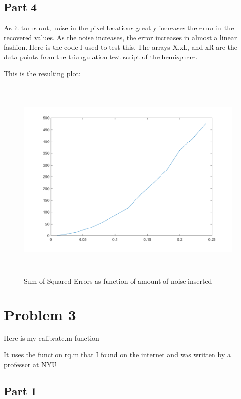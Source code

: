 \documentclass[11pt,psfig]{article}
\begin{document}
\subsection{Part 4}

As it turns out, noise in the pixel locations greatly increases the error in the recovered values. As the noise increases, the error increases in almost a linear fashion. Here is the code I used to test this. The arrays X,xL, and xR are the data points from the triangulation test script of the hemisphere.

This is the resulting plot:
\begin{figure}[H]
\centering
\includegraphics[height=4in]{prob2part4plot.png}
\caption{Sum of Squared Errors as function of amount of noise inserted}
\end{figure}

\newpage


\section{Problem 3}

Here is my calibrate.m function

It uses the function rq.m that I found on the internet and was written by a professor at NYU


\subsection{Part 1}
\end{document}
